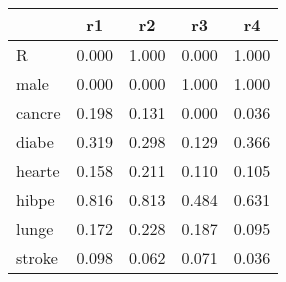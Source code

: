 \begin{table}[htbp]
\begin{tabular}{lcccc} \hline \hline
 & r1  & r2  & r3  & r4  \\  \hline 
R &     0.000 &     1.000 &     0.000 &     1.000 \\  
male &     0.000 &     0.000 &     1.000 &     1.000 \\  
cancre &     0.198 &     0.131 &     0.000 &     0.036 \\  
diabe &     0.319 &     0.298 &     0.129 &     0.366 \\  
hearte &     0.158 &     0.211 &     0.110 &     0.105 \\  
hibpe &     0.816 &     0.813 &     0.484 &     0.631 \\  
lunge &     0.172 &     0.228 &     0.187 &     0.095 \\  
stroke &     0.098 &     0.062 &     0.071 &     0.036 \\  
\hline \hline \end{tabular}
\end{table}

